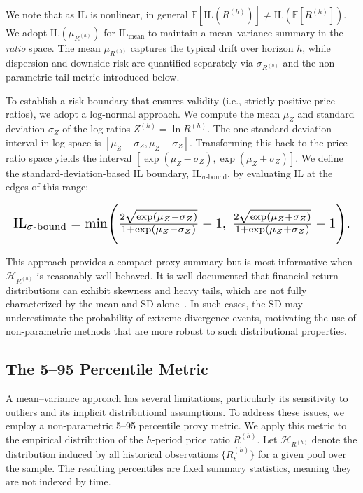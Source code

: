 \documentclass[anonymous]{lipics-v2021}
\begin{document}
We note that as $\mathrm{IL}$ is nonlinear, in general
$\mathbb{E}[\mathrm{IL}(R^{(h)})] \neq \mathrm{IL}(\mathbb{E}[R^{(h)}])$.
{We adopt $\mathrm{IL}(\mu_{R^{(h)}})$ for $\mathrm{IL}_{\text{mean}}$ to maintain a mean--variance summary in the \emph{ratio} space. The mean $\mu_{R^{(h)}}$ captures the typical drift over horizon $h$, while dispersion and downside risk are quantified separately via $\sigma_{R^{(h)}}$ and the non-parametric tail metric introduced below.}

To establish a risk boundary that ensures validity (i.e., strictly positive price ratios), we adopt a log-normal approach. We compute the mean \(\mu_{Z}\) and standard deviation \(\sigma_{Z}\) of the log-ratios \(Z^{(h)} = \ln R^{(h)}\). The one-standard-deviation interval in log-space is \([\mu_{Z}-\sigma_{Z}, \mu_{Z}+\sigma_{Z}]\). Transforming this back to the price ratio space yields the interval \([\exp(\mu_{Z}-\sigma_{Z}), \exp(\mu_{Z}+\sigma_{Z})]\). We define the standard-deviation-based IL boundary, \(\mathrm{IL}_{\sigma\text{-bound}}\), by evaluating IL at the edges of this range:

\begin{equation}
\label{eq:il_sigma_bound}
\resizebox{\linewidth}{!}{$%
\mathrm{IL}_{\sigma\text{-bound}}
= \min\Biggl(
\frac{2\sqrt{\exp(\mu_{Z} - \sigma_{Z})}}{1+\exp(\mu_{Z} - \sigma_{Z})} - 1,\;
\frac{2\sqrt{\exp(\mu_{Z} + \sigma_{Z})}}{1+\exp(\mu_{Z} + \sigma_{Z})} - 1
\Biggr).
$}
\end{equation}

{This approach provides a compact proxy summary but is most informative when $\mathcal{H}_{R^{(h)}}$ is reasonably well-behaved. It is well documented that financial return distributions can exhibit skewness and heavy tails, which are not fully characterized by the mean and SD alone~\cite{mandelbrot2004fractals}. In such cases, the SD may underestimate the probability of extreme divergence events, motivating the use of non-parametric methods that are more robust to such distributional properties.}

\subsection{The 5--95 Percentile Metric}

{A mean--variance approach has several limitations, particularly its sensitivity to outliers and its implicit distributional assumptions. To address these issues, we employ a non-parametric 5--95 percentile proxy metric. We apply this metric to the empirical distribution of the $h$-period price ratio $R^{(h)}$. Let $\mathcal{H}_{R^{(h)}}$ denote the distribution induced by all historical observations $\{R^{(h)}_t\}$ for a given pool over the sample. The resulting percentiles are fixed summary statistics, meaning they are not indexed by time.}
\end{document}
